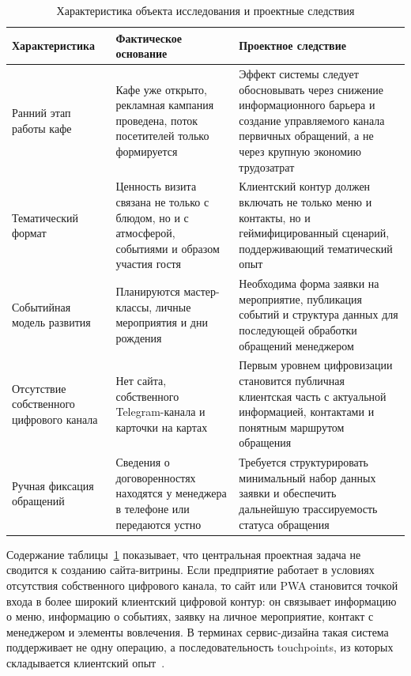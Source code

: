 \begin{table}[H]
\centering
\small
\caption{Характеристика объекта исследования и проектные следствия}
\label{tab:v2_object_characteristics}
\begin{tabularx}{\textwidth}{|>{\raggedright\arraybackslash}p{}|>{\raggedright\arraybackslash}p{}|>{\raggedright\arraybackslash}X|}
\hline
\textbf{Характеристика} & \textbf{Фактическое основание} & \textbf{Проектное следствие} \\ \hline
Ранний этап работы кафе & Кафе уже открыто, рекламная кампания проведена, поток посетителей только формируется & Эффект системы следует обосновывать через снижение информационного барьера и создание управляемого канала первичных обращений, а не через крупную экономию трудозатрат \\ \hline
Тематический формат & Ценность визита связана не только с блюдом, но и с атмосферой, событиями и образом участия гостя & Клиентский контур должен включать не только меню и контакты, но и геймифицированный сценарий, поддерживающий тематический опыт \\ \hline
Событийная модель развития & Планируются мастер-классы, личные мероприятия и дни рождения & Необходима форма заявки на мероприятие, публикация событий и структура данных для последующей обработки обращений менеджером \\ \hline
Отсутствие собственного цифрового канала & Нет сайта, собственного Telegram-канала и карточки на картах & Первым уровнем цифровизации становится публичная клиентская часть с актуальной информацией, контактами и понятным маршрутом обращения \\ \hline
Ручная фиксация обращений & Сведения о договоренностях находятся у менеджера в телефоне или передаются устно & Требуется структурировать минимальный набор данных заявки и обеспечить дальнейшую трассируемость статуса обращения \\ \hline
\end{tabularx}
\normalsize
\end{table}

Содержание таблицы~\ref{tab:v2_object_characteristics} показывает, что центральная проектная задача не сводится к созданию сайта-витрины. Если предприятие работает в условиях отсутствия собственного цифрового канала, то сайт или PWA становится точкой входа в более широкий клиентский цифровой контур: он связывает информацию о меню, информацию о событиях, заявку на личное мероприятие, контакт с менеджером и элементы вовлечения. В терминах сервис-дизайна такая система поддерживает не одну операцию, а последовательность touchpoints, из которых складывается клиентский опыт~\cite{stickdorn2018,pantouvakis2022}.

